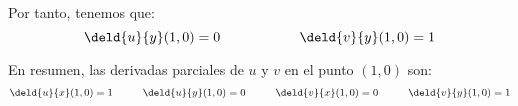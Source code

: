 \begin{ejercicio}
    Por tanto, tenemos que:
    \begin{equation*}
        \deld{u}{y}(1,0) = 0 \hspace{2cm}
        \deld{v}{y}(1,0) = 1
    \end{equation*}

    En resumen, las derivadas parciales de $u$ y $v$ en el punto $(1,0)$ son:
    \begin{equation*}
        \deld{u}{x}(1,0) = 1 \hspace{1cm}
        \deld{u}{y}(1,0) = 0 \hspace{1cm}
        \deld{v}{x}(1,0) = 0 \hspace{1cm}
        \deld{v}{y}(1,0) = 1
    \end{equation*}
\end{ejercicio}




